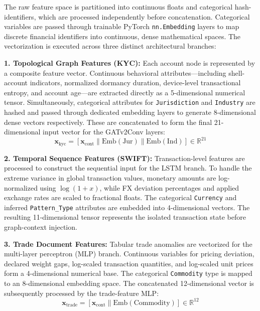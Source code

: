 \documentclass[conference]{IEEEtran}
\begin{document}
The raw feature space is partitioned into continuous floats and categorical hash-identifiers, which are processed independently before concatenation. Categorical variables are passed through trainable PyTorch \texttt{nn.Embedding} layers to map discrete financial identifiers into continuous, dense mathematical spaces. The vectorization is executed across three distinct architectural branches:

\textbf{1. Topological Graph Features (KYC):} 
Each account node is represented by a composite feature vector. Continuous behavioral attributes—including shell-account indicators, normalized dormancy duration, device-level transactional entropy, and account age—are extracted directly as a 5-dimensional numerical tensor. Simultaneously, categorical attributes for \texttt{Jurisdiction} and \texttt{Industry} are hashed and passed through dedicated embedding layers to generate 8-dimensional dense vectors respectively. These are concatenated to form the final 21-dimensional input vector for the GATv2Conv layers:
\begin{equation}
\mathbf{x}_{\text{kyc}} = [\mathbf{x}_{\text{cont}} \parallel \text{Emb}(\text{Jur}) \parallel \text{Emb}(\text{Ind})] \in \mathbb{R}^{21}
\end{equation}

\textbf{2. Temporal Sequence Features (SWIFT):}
Transaction-level features are processed to construct the sequential input for the LSTM branch. To handle the extreme variance in global transaction values, monetary amounts are log-normalized using $\log(1 + x)$, while FX deviation percentages and applied exchange rates are scaled to fractional floats. The categorical \texttt{Currency} and inferred \texttt{Pattern\_Type} attributes are embedded into 4-dimensional vectors. The resulting 11-dimensional tensor represents the isolated transaction state before graph-context injection.

\textbf{3. Trade Document Features:}
Tabular trade anomalies are vectorized for the multi-layer perceptron (MLP) branch. Continuous variables for pricing deviation, declared weight gaps, log-scaled transaction quantities, and log-scaled unit prices form a 4-dimensional numerical base. The categorical \texttt{Commodity} type is mapped to an 8-dimensional embedding space. The concatenated 12-dimensional vector is subsequently processed by the trade-feature MLP:
\begin{equation}
\mathbf{x}_{\text{trade}} = [\mathbf{x}_{\text{cont}} \parallel \text{Emb}(\text{Commodity})] \in \mathbb{R}^{12}
\end{equation}
\end{document}
